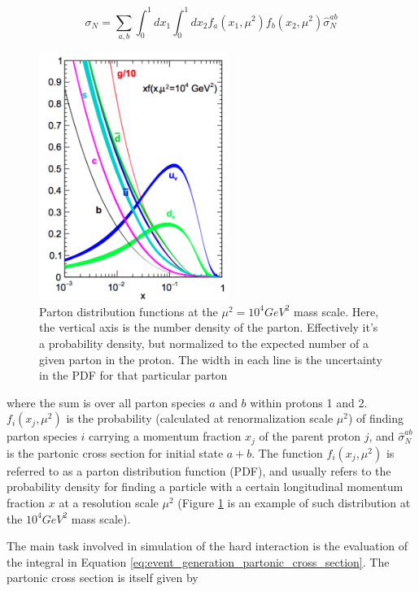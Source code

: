 \begin{equation}
\sigma_{N} = \sum_{a,b}\int_{0}^{1}dx_{1}\int_{0}^{1}dx_{2}f_{a}(x_{1},\mu^{2})f_{b}(x_{2},\mu^{2})\hat{\sigma}_{N}^{ab}
\end{equation}

\begin{figure}[h]
 	\centering
 	\includegraphics[width=0.55\textwidth]{figures/pdfs.png}
 	\singlespace
 	\caption{Parton distribution functions at the $\mu^{2}=10^{4}GeV^{2}$ mass scale. Here, the vertical axis is the number density of the parton. Effectively it's a probability density, but normalized to the expected number of a given parton in the proton. The width in each line is the uncertainty in the PDF for that particular parton\cite{Martin:2009iq}}
 	\label{fig:pdfs}
 \end{figure}

where the sum is over all parton species $a$ and $b$ within protons 1 and 2. $f_{i}(x_{j},\mu^{2})$ is the probability (calculated at renormalization scale $\mu^{2}$) of finding parton species $i$ carrying a momentum fraction $x_{j}$ of the parent proton $j$, and $\hat{\sigma}_{N}^{ab}$ is the partonic cross section for initial state $a+b$. The function $f_{i}(x_{j},\mu^{2})$ is referred to as a parton distribution function (PDF), and usually refers to the probability density for finding a particle with a certain longitudinal momentum fraction $x$ at a resolution scale $\mu^{2}$ (Figure \ref{fig:pdfs} is an example of such distribution at the $10^{4} GeV^{2}$ mass scale).

 The main task involved in simulation of the hard interaction is the evaluation of the integral in Equation \ref{eq:event_generation_partonic_cross_section}. The partonic cross section is itself given by

